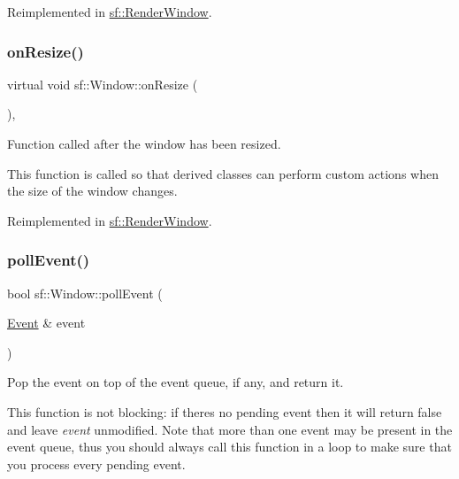 Reimplemented in \mbox{\hyperlink{classsf_1_1_render_window_a5bef0040b0fa87bed9fbd459c980d53a}{sf\+::\+Render\+Window}}.

\mbox{\label{classsf_1_1_window_a10f567a387da7b49f417f73321fcf64d}} 
\subsubsection{\texorpdfstring{onResize()}{onResize()}}
{\footnotesize\ttfamily virtual void sf\+::\+Window\+::on\+Resize (\begin{DoxyParamCaption}{ }\end{DoxyParamCaption})\hspace{0.3cm}{\ttfamily [protected]}, {\ttfamily [virtual]}}



Function called after the window has been resized. 

This function is called so that derived classes can perform custom actions when the size of the window changes. \begin{DoxyVerb}\end{DoxyVerb}
 

Reimplemented in \mbox{\hyperlink{classsf_1_1_render_window_a5c85fe482313562d33ffd24a194b6fef}{sf\+::\+Render\+Window}}.

\mbox{\label{classsf_1_1_window_a338e996585faf82e93069858e3b531b7}} 
\subsubsection{\texorpdfstring{pollEvent()}{pollEvent()}}
{\footnotesize\ttfamily bool sf\+::\+Window\+::poll\+Event (\begin{DoxyParamCaption}\item[{\mbox{\hyperlink{classsf_1_1_event}{Event}} \&}]{event }\end{DoxyParamCaption})}



Pop the event on top of the event queue, if any, and return it. 

This function is not blocking\+: if there\textquotesingle{}s no pending event then it will return false and leave {\itshape event} unmodified. Note that more than one event may be present in the event queue, thus you should always call this function in a loop to make sure that you process every pending event. 
\begin{DoxyCode}{0}
\DoxyCodeLine{\{}
\DoxyCodeLine{   \textcolor{comment}{// process event...}}
\DoxyCodeLine{\}}
\end{DoxyCode}



